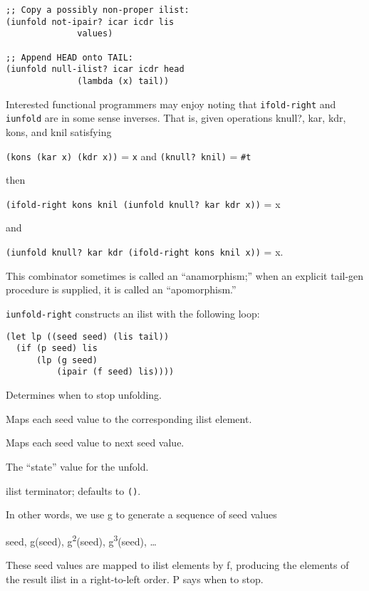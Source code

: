\begin{description}
\begin{verbatim}
;; Copy a possibly non-proper ilist:
(iunfold not-ipair? icar icdr lis 
              values)

;; Append HEAD onto TAIL:
(iunfold null-ilist? icar icdr head 
              (lambda (x) tail))
\end{verbatim}

Interested functional programmers may enjoy noting that
\texttt{ifold-right} and \texttt{iunfold} are in some sense inverses.
That is, given operations knull?, kar, kdr, kons, and knil satisfying

\texttt{(kons\ (kar\ x)\ (kdr\ x))} = \texttt{x} and
\texttt{(knull?\ knil)} = \texttt{\#t}

then

\texttt{(ifold-right\ kons\ knil\ (iunfold\ knull?\ kar\ kdr\ x))} = x

and

\texttt{(iunfold\ knull?\ kar\ kdr\ (ifold-right\ kons\ knil\ x))} = x.

This combinator sometimes is called an ``anamorphism;'' when an explicit
tail-gen procedure is supplied, it is called an ``apomorphism.''
\item[ \href{}{} \texttt{iunfold-right} p f g seed {[}tail{]}
-\textgreater{} ilist ]
\texttt{iunfold-right} constructs an ilist with the following loop:

\begin{verbatim}
(let lp ((seed seed) (lis tail))
  (if (p seed) lis
      (lp (g seed)
          (ipair (f seed) lis))))
\end{verbatim}

\begin{description}
\tightlist
\item[ p ]
Determines when to stop unfolding.
\item[ f ]
Maps each seed value to the corresponding ilist element.
\item[ g ]
Maps each seed value to next seed value.
\item[ seed ]
The ``state'' value for the unfold.
\item[ tail ]
ilist terminator; defaults to \texttt{\textquotesingle{}()}.
\end{description}

In other words, we use g to generate a sequence of seed values

seed, g(seed), g\textsuperscript{2}(seed), g\textsuperscript{3}(seed),
\ldots{}

These seed values are mapped to ilist elements by f, producing the
elements of the result ilist in a right-to-left order. P says when to
stop.


\end{description}

